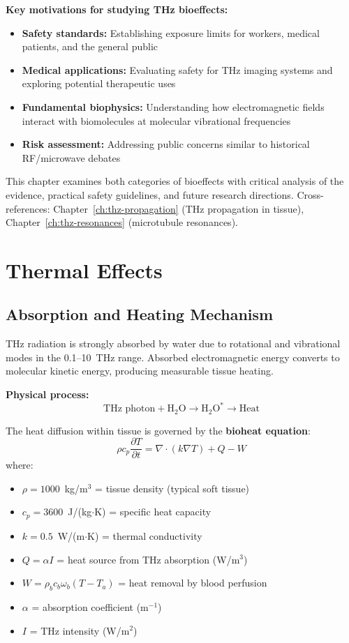 \textbf{Key motivations for studying THz bioeffects:}
\begin{itemize}
\item \textbf{Safety standards:} Establishing exposure limits for workers, medical patients, and the general public
\item \textbf{Medical applications:} Evaluating safety for THz imaging systems and exploring potential therapeutic uses
\item \textbf{Fundamental biophysics:} Understanding how electromagnetic fields interact with biomolecules at molecular vibrational frequencies
\item \textbf{Risk assessment:} Addressing public concerns similar to historical RF/microwave debates
\end{itemize}

This chapter examines both categories of bioeffects with critical analysis of the evidence, practical safety guidelines, and future research directions. Cross-references: Chapter~\ref{ch:thz-propagation} (THz propagation in tissue), Chapter~\ref{ch:thz-resonances} (microtubule resonances).

\section{Thermal Effects}
\label{sec:thermal-effects}

\subsection{Absorption and Heating Mechanism}

THz radiation is strongly absorbed by water due to rotational and vibrational modes in the 0.1--10~THz range. Absorbed electromagnetic energy converts to molecular kinetic energy, producing measurable tissue heating.

\textbf{Physical process:}
\begin{equation}
\text{THz photon} + \text{H}_2\text{O} \rightarrow \text{H}_2\text{O}^* \rightarrow \text{Heat}
\end{equation}

The heat diffusion within tissue is governed by the \textbf{bioheat equation}:
\begin{equation}
\rho c_p \frac{\partial T}{\partial t} = \nabla \cdot (k \nabla T) + Q - W
\label{eq:bioheat}
\end{equation}
where:
\begin{itemize}
\item $\rho = 1000$~kg/m$^3$ = tissue density (typical soft tissue)
\item $c_p = 3600$~J/(kg$\cdot$K) = specific heat capacity
\item $k = 0.5$~W/(m$\cdot$K) = thermal conductivity
\item $Q = \alpha I$ = heat source from THz absorption (W/m$^3$)
\item $W = \rho_b c_b \omega_b (T - T_a)$ = heat removal by blood perfusion
\item $\alpha$ = absorption coefficient (m$^{-1}$)
\item $I$ = THz intensity (W/m$^2$)
\end{itemize}

